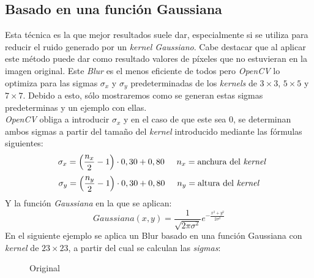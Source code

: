 \subsection{Basado en una función Gaussiana}
Esta técnica es la que mejor resultados suele dar, especialmente si se
utiliza para reducir el ruido generado por un \emph{kernel
  Gaussiano}. Cabe destacar que al aplicar este método puede dar como
resultado valores de píxeles que no estuvieran en la imagen
original. Este \emph{Blur} es el menos eficiente de todos pero
\emph{OpenCV} lo optimiza para las sigmas $\sigma_x$ y $\sigma_y$
predeterminadas de los \emph{kernels} de $3\times3$, $5\times5$ y
$7\times7$. Debido a esto, sólo mostraremos como se
generan estas sigmas predeterminas y un ejemplo con ellas.\\
\emph{OpenCV} obliga a introducir $\sigma_x$ y en el caso de que este
sea $0$, se determinan ambos sigmas a partir del tamaño del
\emph{kernel} introducido mediante las fórmulas siguientes:
\begin{equation*}
  \hspace{0.25cm}\sigma_x = \left(\frac{n_x}{2} - 1 \right) \cdot 0,30 + 0,80 \hspace{0.5cm} n_x = \text{anchura del \emph{kernel}}
\end{equation*}
\begin{equation*}
  \sigma_y = \left(\frac{n_y}{2} - 1 \right) \cdot 0,30 + 0,80 \hspace{0.5cm} n_y = \text{altura del \emph{kernel}}
\end{equation*}
Y la función \emph{Gaussiana} en la que se aplican:
\begin{equation*}
  Gaussiana(x, y) = \frac{1}{\sqrt{2 \pi \sigma^{2}}}e^{- \frac{x^{2}+y^{2}}{2\sigma^{2}}}
\end{equation*}
En el siguiente ejemplo se aplica un Blur basado en una función
Gaussiana con \emph{kernel} de $23 \times 23$, a partir del cual se
calculan las \emph{sigmas}:

\begin{figure}[H]
  \caption{Original}
  \centering \setlength\fboxsep{0pt} \setlength\fboxrule{0.5pt}
\end{figure}

